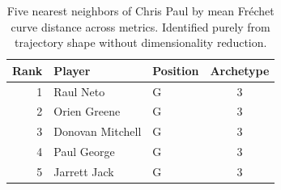 \begin{table}[htbp]
  \centering\small
  \begin{tabular}{rllc}
    \toprule
    Rank & Player & Position & Archetype \\
    \midrule
    1 & Raul Neto & G & 3 \\
    2 & Orien Greene & G & 3 \\
    3 & Donovan Mitchell & G & 3 \\
    4 & Paul George & G & 3 \\
    5 & Jarrett Jack & G & 3 \\
    \bottomrule
  \end{tabular}
  \caption{Five nearest neighbors of Chris Paul by mean Fr\'{e}chet curve distance across metrics. Identified purely from trajectory shape without dimensionality reduction.}
  \label{tab:Chris_Paul_frechet_curve_neighbors}
\end{table}

